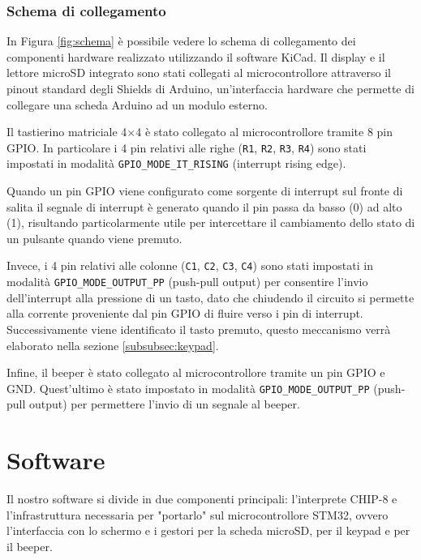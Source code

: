 \documentclass[a4paper]{article}
\begin{document}
\subsubsection{Schema di collegamento}\label{subsubsec:collegamenti}

In Figura \ref{fig:schema} è possibile vedere lo schema di collegamento
dei componenti hardware realizzato utilizzando il software KiCad.
Il display e il lettore microSD integrato sono stati collegati al microcontrollore
attraverso il pinout standard degli Shields di Arduino, un'interfaccia hardware che permette
di collegare una scheda Arduino ad un modulo esterno.

Il tastierino matriciale 4$\times$4 è stato collegato al microcontrollore tramite 8 pin GPIO.
In particolare i 4 pin relativi alle righe (\texttt{R1}, \texttt{R2}, \texttt{R3}, \texttt{R4})
sono stati impostati in modalità \texttt{GPIO\_MODE\_IT\_RISING} (interrupt rising edge).

Quando un pin GPIO viene configurato come sorgente di interrupt sul fronte di salita
il segnale di interrupt è generato quando il pin passa da basso (0) ad alto (1), risultando
particolarmente utile per intercettare il cambiamento dello stato di un
pulsante quando viene premuto.

Invece, i 4 pin relativi alle colonne (\texttt{C1}, \texttt{C2}, \texttt{C3}, \texttt{C4})
sono stati impostati in modalità \texttt{GPIO\_MODE\_OUTPUT\_PP} (push-pull output) per
consentire l'invio dell'interrupt alla pressione di un tasto, dato che chiudendo il circuito
si permette alla corrente proveniente dal pin GPIO di fluire verso i pin di interrupt.
Successivamente viene identificato il tasto premuto, questo meccanismo verrà elaborato
nella sezione \ref{subsubsec:keypad}.

\clearpage

Infine, il beeper è stato collegato al microcontrollore tramite un pin GPIO e GND.
Quest'ultimo è stato impostato in modalità \texttt{GPIO\_MODE\_OUTPUT\_PP} (push-pull output)
per permettere l'invio di un segnale al beeper.

\section{Software}

Il nostro software si divide in due componenti principali: l'interprete CHIP-8 e
l'infrastruttura necessaria per "portarlo" sul microcontrollore STM32, ovvero l'interfaccia
con lo schermo e i gestori per la scheda microSD, per il keypad e per il beeper.
\end{document}
